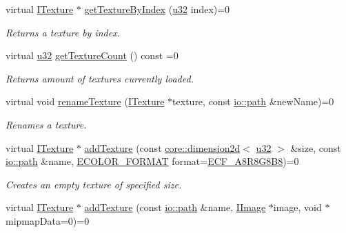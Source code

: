 \begin{DoxyCompactItemize}
virtual \hyperlink{classirr_1_1video_1_1ITexture}{I\+Texture} $\ast$ \hyperlink{classirr_1_1video_1_1IVideoDriver_abfe395b1320ac52cea6be0e912135351}{get\+Texture\+By\+Index} (\hyperlink{namespaceirr_a0416a53257075833e7002efd0a18e804}{u32} index)=0
\begin{DoxyCompactList}\small\item\em Returns a texture by index. \end{DoxyCompactList}\item 
virtual \hyperlink{namespaceirr_a0416a53257075833e7002efd0a18e804}{u32} \hyperlink{classirr_1_1video_1_1IVideoDriver_a4c3f976980dd8387db37feca8c8e2d73}{get\+Texture\+Count} () const =0
\begin{DoxyCompactList}\small\item\em Returns amount of textures currently loaded. \end{DoxyCompactList}\item 
virtual void \hyperlink{classirr_1_1video_1_1IVideoDriver_a2cefddb9ebd7f46ee946c04b301a5c5b}{rename\+Texture} (\hyperlink{classirr_1_1video_1_1ITexture}{I\+Texture} $\ast$texture, const \hyperlink{namespaceirr_1_1io_ab1bdc45edb3f94d8319c02bc0f840ee1}{io\+::path} \&new\+Name)=0
\begin{DoxyCompactList}\small\item\em Renames a texture. \end{DoxyCompactList}\item 
virtual \hyperlink{classirr_1_1video_1_1ITexture}{I\+Texture} $\ast$ \hyperlink{classirr_1_1video_1_1IVideoDriver_a8c02ee280bb738cdf38b77e7a798244e}{add\+Texture} (const \hyperlink{classirr_1_1core_1_1dimension2d}{core\+::dimension2d}$<$ \hyperlink{namespaceirr_a0416a53257075833e7002efd0a18e804}{u32} $>$ \&size, const \hyperlink{namespaceirr_1_1io_ab1bdc45edb3f94d8319c02bc0f840ee1}{io\+::path} \&name, \hyperlink{namespaceirr_1_1video_a1d5e487888c32b1674a8f75116d829ed}{E\+C\+O\+L\+O\+R\+\_\+\+F\+O\+R\+M\+AT} format=\hyperlink{namespaceirr_1_1video_a1d5e487888c32b1674a8f75116d829eda55c57d63efff39efe33ee733fe962df0}{E\+C\+F\+\_\+\+A8\+R8\+G8\+B8})=0
\begin{DoxyCompactList}\small\item\em Creates an empty texture of specified size. \end{DoxyCompactList}\item 
virtual \hyperlink{classirr_1_1video_1_1ITexture}{I\+Texture} $\ast$ \hyperlink{classirr_1_1video_1_1IVideoDriver_abfebeb09a692c0d6b4741d952d97668e}{add\+Texture} (const \hyperlink{namespaceirr_1_1io_ab1bdc45edb3f94d8319c02bc0f840ee1}{io\+::path} \&name, \hyperlink{classirr_1_1video_1_1IImage}{I\+Image} $\ast$image, void $\ast$mipmap\+Data=0)=0

\end{DoxyCompactItemize}
